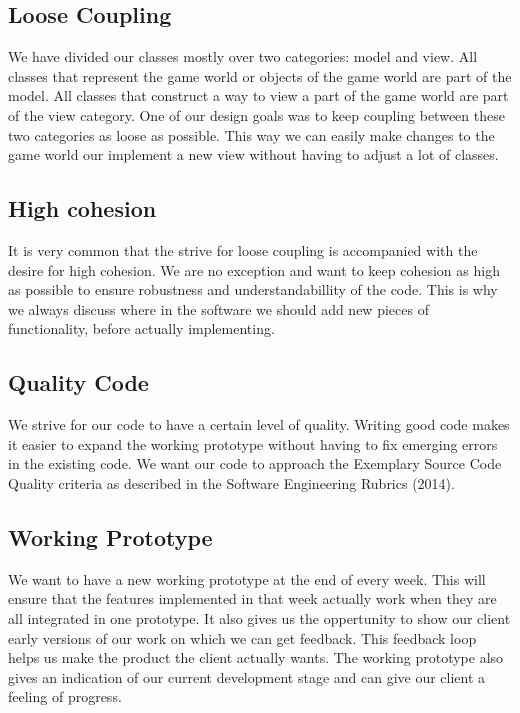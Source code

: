 \subsection{Loose Coupling}

We have divided our classes mostly over two categories: model and view. All classes that represent the game world or objects of the game world are part of the model. All classes that construct a way to view a part of the game world are part of the view category. One of our design goals was to keep coupling between these two categories as loose as possible. This way we can easily make changes to the game world our implement a new view without having to adjust a lot of classes.

\subsection{High cohesion}
It is very common that the strive for loose coupling is accompanied with the desire for high cohesion. We are no exception and want to keep cohesion as high as possible to ensure robustness and understandabillity of the code. This is why we always discuss  where in the software we should add new pieces of functionality, before actually implementing.

\subsection{Quality Code}

We strive for our code to have a certain level of quality. Writing good code makes it easier to expand the working prototype without having to fix emerging errors in the existing code. We want our code to approach the Exemplary Source Code Quality criteria as described in the Software Engineering Rubrics (2014).
\subsection{Working Prototype}

We want to have a new working prototype at the end of every week. This will ensure that the features implemented in that week actually work when they are all integrated in one prototype. It also gives us the oppertunity to show our client early versions of our work on which we can get feedback. This feedback loop helps us make the product the client actually wants. The  working prototype also gives an indication of our current development stage and can give our client a feeling of progress.
